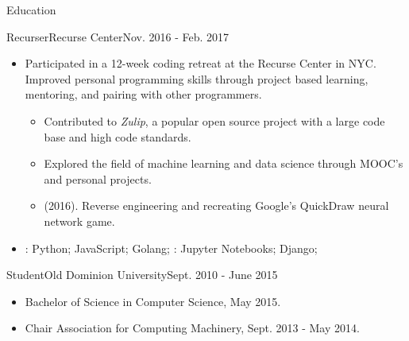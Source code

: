 \documentclass[]{mcdowellcv}
\begin{document}
    \begin{cvsection}{Education}
        \begin{cvsubsection}{Recurser}{Recurse Center}{Nov. 2016 - Feb. 2017}
            \begin{itemize}
                \item Participated in a 12-week coding retreat at the Recurse Center in NYC. Improved personal programming skills through project based learning, mentoring, and pairing with other programmers.
                \begin{itemize}
                    \item Contributed to \textit{Zulip}, a popular open source project with a large code base and high code standards.
                    \item Explored the field of machine learning and data science through MOOC's and personal projects.
                    \item {} (2016). Reverse engineering and recreating Google's QuickDraw neural network game.
                \end{itemize}
            \end{itemize}
            \begin{itemize}
                 \item {}: Python; JavaScript; Golang; \newline
                 : Jupyter Notebooks; Django;
            \end{itemize}
        \end{cvsubsection}
        \begin{cvsubsection}{Student}{Old Dominion University}{Sept. 2010 - June 2015}
            \begin{itemize}
                \item  Bachelor of Science in Computer Science, May 2015.
                \item Chair Association for Computing Machinery, Sept. 2013 - May 2014.
            \end{itemize}
        \end{cvsubsection}
    \end{cvsection}
\end{document}
